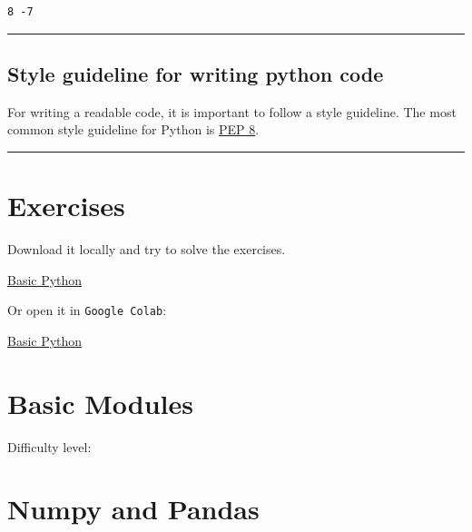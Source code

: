 \documentclass[
  letterpaper,
  DIV=11,
  numbers=noendperiod]{scrreprt}
\begin{document}
\begin{verbatim}
8 -7
\end{verbatim}

\begin{center}\rule{0.5\linewidth}{0.5pt}\end{center}

\section*{Style guideline for writing python
code}\label{style-guideline-for-writing-python-code}


For writing a readable code, it is important to follow a style
guideline. The most common style guideline for Python is
\href{https://www.python.org/dev/peps/pep-0008/}{PEP 8}.

\begin{center}\rule{0.5\linewidth}{0.5pt}\end{center}

\chapter*{Exercises}\label{exercises}


Download it locally and try to solve the exercises.

\href{https://github.com/stkroe/PythonforChemists/blob/main/course/examples/notebooks/ex1.zip}{Basic
Python}

Or open it in \texttt{Google\ Colab}:

\href{https://colab.research.google.com/github/stkroe/PythonforChemists/blob/main/course/examples/notebooks/ex1/material/student/BasicExercises.ipynb}{Basic
Python}

\chapter{Basic Modules}\label{basic-modules}

Difficulty level: { }

\chapter*{Numpy and Pandas}\label{numpy-and-pandas}
\end{document}

